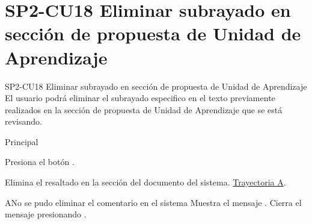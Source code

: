 \chapter{SP2-CU18 Eliminar subrayado en sección de propuesta de Unidad de Aprendizaje}
\begin{UseCase}{SP2-CU18}{ Eliminar subrayado en sección de propuesta de Unidad de Aprendizaje }{El usuario podrá eliminar el subrayado especifico en el texto previamente realizados en la sección de propuesta de Unidad de Aprendizaje que se está revisando.}
\end{UseCase}

\begin{UCtrayectoria}{Principal}


    \UCpaso[\UCactor] Presiona el botón . 
    
    \UCpaso Elimina el resaltado en la sección del documento del sistema. \hyperref[SP2-CU18-A]{Trayectoria A}.
\end{UCtrayectoria}


\label{SP2-CU18-A}
\begin{UCtrayectoriaA}{A}{No se pudo eliminar el comentario en el sistema}
  \UCpaso Muestra el mensaje .
  \UCpaso[\UCactor] Cierra el mensaje presionando .
\end{UCtrayectoriaA}



